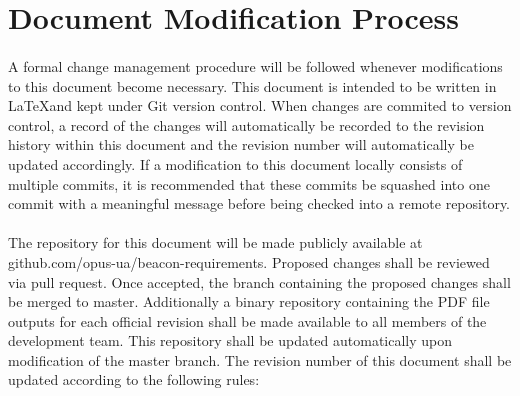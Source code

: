 \section{Document Modification Process}
\paragraph*{}
    A formal change management procedure will be followed whenever modifications
    to this document become necessary. This document is intended to be written in
    \LaTeX and kept under
    Git version control. When changes are commited to version control, a record
    of the changes will automatically be recorded to the revision history within this document and the
    revision number will automatically be updated accordingly. If a modification to this document
    locally consists of multiple commits, it is recommended that these commits be
    squashed into one commit with a meaningful message before being checked into a
    remote repository.

\paragraph*{}
    The repository for this document will be made publicly available at 
    github.com/opus-ua/beacon-requirements. Proposed changes shall be reviewed via pull request. Once
    accepted, the branch containing the proposed changes shall be merged to master. 
    Additionally a binary repository containing the PDF file outputs for each official revision
    shall be made available to all members of the development team. This repository
    shall be updated automatically upon modification of the master branch. The revision
    number of this document shall be updated according to the following rules:

